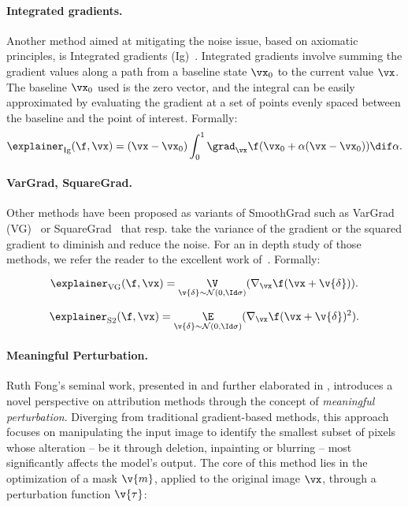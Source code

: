 \paragraph{Integrated gradients.} Another method aimed at mitigating the noise issue, based on axiomatic principles, is Integrated gradients (Ig)~\cite{sundararajan2017axiomatic}. Integrated gradients involve summing the gradient values along a path from a baseline state $\vx_0$ to the current value $\vx$. The baseline $\vx_0$ used is the zero vector, and the integral can be easily approximated by evaluating the gradient at a set of points evenly spaced between the baseline and the point of interest. Formally:
$$ 
\explainer_{\text{Ig}}(\f, \vx) = (\vx - \vx_0) \int_0^1 \grad_{\vx} \f(\vx_0 + \alpha(\vx - \vx_0)) \dif\alpha. 
$$

\paragraph{VarGrad, SquareGrad.} Other methods have been proposed as variants of SmoothGrad such as VarGrad (VG)~\cite{hooker2018benchmark} or SquareGrad~\cite{hooker2018benchmark} that resp. take the variance of the gradient or the squared gradient to diminish and reduce the noise. For an in depth study of those methods, we refer the reader to the excellent work of~\cite{seo2018noise}. Formally:


$$ 
\explainer_{\text{VG}}(\f, \vx) = \underset{\v{\delta} \sim \mathcal{N}(0, \Id\sigma)}{\V}(\nabla_{\vx} \f( \vx + \v{\delta}) ).
$$

$$ 
\explainer_{\text{S2}}(\f, \vx) = \underset{\v{\delta} \sim \mathcal{N}(0, \Id\sigma)}{\E}(\nabla_{\vx} \f( \vx + \v{\delta})^2 ).
$$

\paragraph{Meaningful Perturbation.} Ruth Fong's seminal work, presented in \cite{fong2017meaningful} and further elaborated in \cite{fong2019extremal}, introduces a novel perspective on attribution methods through the concept of \textit{meaningful perturbation}. Diverging from traditional gradient-based methods, this approach focuses on manipulating the input image to identify the smallest subset of pixels whose alteration -- be it through deletion, inpainting or  blurring -- most significantly affects the model's output. The core of this method lies in the optimization of a mask $\v{m}$, applied to the original image $\vx$, through a perturbation function $\v{\tau}$:

